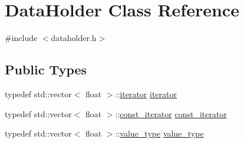 \hypertarget{classDataHolder}{}\section{Data\+Holder Class Reference}
\label{classDataHolder}


{\ttfamily \#include $<$dataholder.\+h$>$}

\subsection*{Public Types}
\begin{DoxyCompactItemize}
\item 
typedef std\+::vector$<$ float $>$\+::\hyperlink{classDataHolder_adecdb7b6c101d8ce9815c2ee2a4596b2}{iterator} \hyperlink{classDataHolder_adecdb7b6c101d8ce9815c2ee2a4596b2}{iterator}
\item 
typedef std\+::vector$<$ float $>$\+::\hyperlink{classDataHolder_a6284772630d15867fe5549a2903944cd}{const\+\_\+iterator} \hyperlink{classDataHolder_a6284772630d15867fe5549a2903944cd}{const\+\_\+iterator}
\item 
typedef std\+::vector$<$ float $>$\+::\hyperlink{classDataHolder_a6a84dd5b409f0eda7112dee0310e0d19}{value\+\_\+type} \hyperlink{classDataHolder_a6a84dd5b409f0eda7112dee0310e0d19}{value\+\_\+type}
\end{DoxyCompactItemize}
